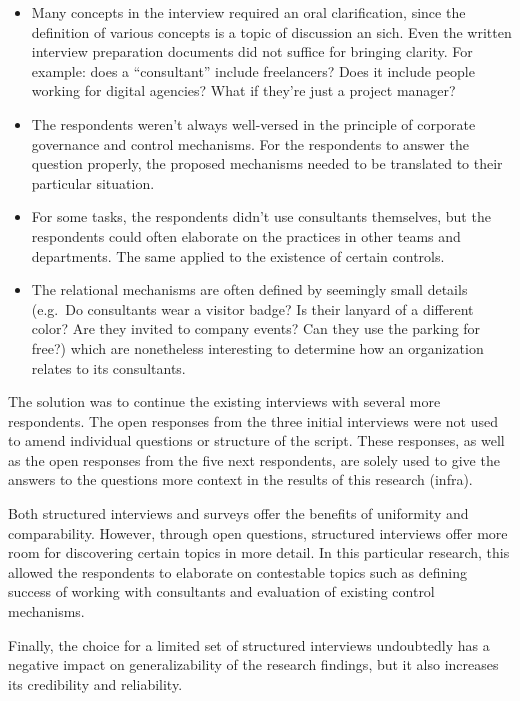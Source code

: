 \documentclass[
  man,floatsintext]{apa6}
\begin{document}
\begin{itemize}
\item
  Many concepts in the interview required an oral clarification, since the definition of various concepts is a topic of discussion an sich. Even the written interview preparation documents did not suffice for bringing clarity. For example: does a ``consultant'' include freelancers? Does it include people working for digital agencies? What if they're just a project manager?
\item
  The respondents weren't always well-versed in the principle of corporate governance and control mechanisms. For the respondents to answer the question properly, the proposed mechanisms needed to be translated to their particular situation.
\item
  For some tasks, the respondents didn't use consultants themselves, but the respondents could often elaborate on the practices in other teams and departments. The same applied to the existence of certain controls.
\item
  The relational mechanisms are often defined by seemingly small details (e.g.~Do consultants wear a visitor badge? Is their lanyard of a different color? Are they invited to company events? Can they use the parking for free?) which are nonetheless interesting to determine how an organization relates to its consultants.
\end{itemize}

The solution was to continue the existing interviews with several more respondents. The open responses from the three initial interviews were not used to amend individual questions or structure of the script. These responses, as well as the open responses from the five next respondents, are solely used to give the answers to the questions more context in the results of this research (infra).

Both structured interviews and surveys offer the benefits of uniformity and comparability. However, through open questions, structured interviews offer more room for discovering certain topics in more detail. In this particular research, this allowed the respondents to elaborate on contestable topics such as defining success of working with consultants and evaluation of existing control mechanisms.

Finally, the choice for a limited set of structured interviews undoubtedly has a negative impact on generalizability of the research findings, but it also increases its credibility and reliability.
\end{document}
